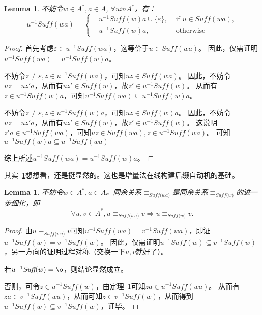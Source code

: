 \documentclass[UTF8]{ctexart}
\newtheorem{lem}[thm]{Lemma}
\theoremstyle{definition}
\theoremstyle{remark}
\numberwithin{equation}{subsection}
\newcommand{\equsuf}[1][x]{\equiv_{\textit{Suff(#1)}}}
\newcommand{\Suff}{\textit{Suff}}
\begin{document}
	\begin{lem}
	\label{lem:sam_build_suff}
		不妨令$w \in A^*, a \in A$, $\forall u in A^*$，有：
		\[
			u^{-1} \Suff(wa) =
			\left\{
				\begin{aligned}
					&u^{-1} \Suff(w)a \cup \{ \varepsilon \},	&\text{ if } u \in \Suff(wa),	\\
					&u^{-1} \Suff(w)a,							&\text{ otherwise }
				\end{aligned}
			\right .
		\]
	\end{lem}
	\begin{proof}
		首先考虑$\varepsilon \in u^{-1} \Suff(wa)$，这等价于$u \in \Suff(wa)$。
		因此，仅需证明$u^{-1} \Suff(wa) = u^{-1} \Suff(w)a$。
		
		不妨令$z \neq \varepsilon, z \in u^{-1} \Suff(wa)$，可知$uz \in \Suff(wa)$。
		因此，不妨令$uz = uz'a$，从而有$uz' \in \Suff(w)$，故$z' \in u^{-1} \Suff(w)$。
		从而有$z \in u^{-1} \Suff(w)a$，可知$u^{-1} \Suff(wa) \subseteq u^{-1} \Suff(w)a$。
		
		不妨令$z \neq \varepsilon, z \in u^{-1} \Suff(w)a$，可知$uz \in \Suff(w)a$。
		因此，不妨令$uz = uz'a$，从而有$uz' \in \Suff(w)$，故$z' \in u^{-1} \Suff(w)$。
		这说明$z'a \in u^{-1} \Suff(wa)$，可知$uz \in \Suff(wa), z \in u^{-1} \Suff(wa)$。
		可知$u^{-1} \Suff(w)a \subseteq u^{-1} \Suff(wa)$
		
		综上所述$u^{-1} \Suff(wa) = u^{-1} \Suff(w)a$。
	\end{proof}
	其实~\ref{lem:sam_build_suff}想想看，还是挺显然的。这也是增量法在线构建后缀自动机的基础。
	
	\begin{lem}
	\label{lem:sam_build_cong}
		不妨令$w \in A^*, a \in A$。同余关系$\equsuf[wa]$是同余关系$\equsuf[w]$的进一步细化，即
		\[
			\forall u,v \in A^*, u \equsuf[wa] v \Longrightarrow u \equsuf[w] v.
		\]
	\end{lem}
	\begin{proof}
		由$u \equsuf[wa] v$可知$u^{-1} \Suff(wa) = v^{-1} \Suff(wa)$，即证$u^{-1} \Suff(w) = v^{-1} \Suff(w)$。
		因此，仅需证明$u^{-1} \Suff(w) \subseteq v^{-1} \Suff(w)$，另一方向的证明过程对称（交换一下$u,v$就好了）。
		
		若$u^{-1} \Suff(w) = {\o}$，则结论显然成立。
		
		否则，可令$z \in u^{-1} \Suff(w)$，由定理~\ref{lem:sam_build_suff}可知$za \in u^{-1} \Suff(wa)$。
		从而有$za \in v^{-1} \Suff(wa)$，从而可知$z \in v^{-1} \Suff(w)$，从而得到
		$u^{-1} \Suff(w) \subseteq v^{-1} \Suff(w)$，证毕。
	\end{proof}
	
\end{document}
